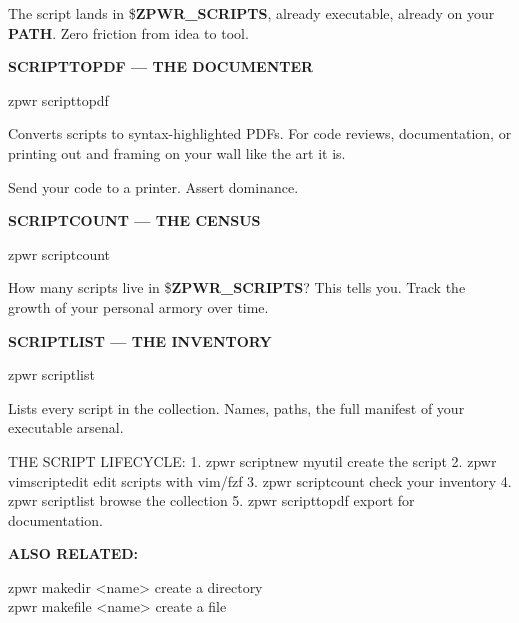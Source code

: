 \documentclass[11pt,a4paper,twoside]{book}
\begin{document}
The script lands in \$\textbf{ZPWR\_SCRIPTS}, already executable, already on your \textbf{PATH}. Zero friction from idea to tool.


\vspace{12pt}
{\bfseries\color{neonyellow} SCRIPTTOPDF — THE DOCUMENTER}\vspace{4pt}

\begin{codebox}
\color{neongreen}zpwr scripttopdf\\
\end{codebox}

Converts scripts to syntax-highlighted PDFs. For code reviews, documentation, or printing out and framing on your wall like the art it is.

Send your code to a printer. Assert dominance.


\vspace{12pt}
{\bfseries\color{neonyellow} SCRIPTCOUNT — THE CENSUS}\vspace{4pt}

\begin{codebox}
\color{neongreen}zpwr scriptcount\\
\end{codebox}

How many scripts live in \$\textbf{ZPWR\_SCRIPTS}? This tells you. Track the growth of your personal armory over time.


\vspace{12pt}
{\bfseries\color{neonyellow} SCRIPTLIST — THE INVENTORY}\vspace{4pt}

\begin{codebox}
\color{neongreen}zpwr scriptlist\\
\end{codebox}

Lists every script in the collection. Names, paths, the full manifest of your executable arsenal.

THE SCRIPT LIFECYCLE: 1. zpwr scriptnew myutil     create the script 2. zpwr vimscriptedit        edit scripts with vim/fzf 3. zpwr scriptcount          check your inventory 4. zpwr scriptlist           browse the collection 5. zpwr scripttopdf          export for documentation.


\vspace{12pt}
{\bfseries\color{neonyellow} ALSO RELATED:}\vspace{4pt}

\begin{codebox}
\color{neongreen}zpwr makedir <name>     create a directory\\
\color{neongreen}zpwr makefile <name>    create a file\\
\end{codebox}
\end{document}
